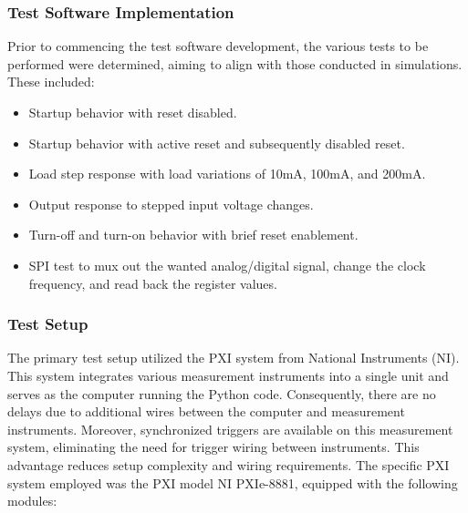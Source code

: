 \subsubsection{Test Software Implementation}
Prior to commencing the test software development, the various tests to be performed were determined, aiming to align with those conducted in simulations. These included:
\begin{itemize}
    \item Startup behavior with reset disabled.
    \item Startup behavior with active reset and subsequently disabled reset.
    \item Load step response with load variations of 10mA, 100mA, and 200mA.
    \item Output response to stepped input voltage changes.
    \item Turn-off and turn-on behavior with brief reset enablement.
    \item SPI test to mux out the wanted analog/digital signal, change the clock frequency, and read back the register values.
\end{itemize}

\subsubsection{Test Setup}
The primary test setup utilized the PXI system from National Instruments (NI). This system integrates various measurement instruments into a single unit and serves as the computer running the Python code. Consequently, there are no delays due to additional wires between the computer and measurement instruments. Moreover, synchronized triggers are available on this measurement system, eliminating the need for trigger wiring between instruments. This advantage reduces setup complexity and wiring requirements. The specific PXI system employed was the PXI model \glqq{}NI PXIe-8881\grqq{}, equipped with the following modules:

